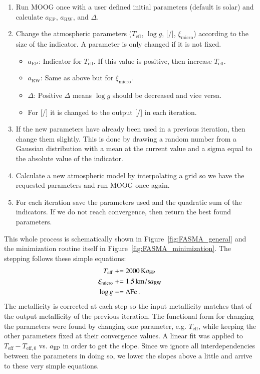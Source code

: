 \documentclass{aa}
\newcommand{\pluseq}{\mathrel{+}=}
\newcommand{\minuseq}{\mathrel{-}=}
\begin{document}
\begin{enumerate}
    \item Run MOOG once with a user defined initial parameters (default is
          solar) and calculate $a_\mathrm{EP}$, $a_\mathrm{RW}$, and
          $\Delta$.
    \item Change the atmospheric parameters ($T_\mathrm{eff}$, $\log g$,
          [/], $\xi_\mathrm{micro}$) according to the size of the
          indicator. A parameter is only changed if it is not fixed.
    \begin{itemize}
        \item $a_\mathrm{EP}$: Indicator for $T_\mathrm{eff}$. If this value
              is positive, then increase $T_\mathrm{eff}$.
        \item $a_\mathrm{RW}$: Same as above but for $\xi_\mathrm{micro}$.
        \item $\Delta$: Positive $\Delta$ means $\log g$
              should be decreased and vice versa.
        \item For [/] it is changed to the output [/]
              in each iteration.
    \end{itemize}
    \item If the new parameters have already been used in a previous iteration,
          then change them slightly. This is done by drawing a random number from
          a Gaussian distribution with a mean at the current value and a sigma
          equal to the absolute value of the indicator.
    \item Calculate a new atmospheric model by interpolating a grid so we have
          the requested parameters and run MOOG once again.
    \item For each iteration save the parameters used and the quadratic sum of
          the indicators. If we do not reach convergence, then return the best
          found parameters.
\end{enumerate}
This whole process is schematically shown in Figure~\ref{fig:FASMA_general} and
the minimization routine itself in Figure~\ref{fig:FASMA_minimization}. The
stepping follows these simple equations:
\begin{align}
    T_\mathrm{eff}     &\pluseq \SI{2000}{K} a_\mathrm{EP}   \\
    \xi_\mathrm{micro} &\pluseq \SI{1.5}{km/s} a_\mathrm{RW} \\
    \log g             &\minuseq \Delta\ion{Fe}.
\end{align}
The metallicity is corrected at each step so the input metallicity matches that
of the output metallicity of the previous iteration. The functional form for
changing the parameters were found by changing one parameter, e.g.
$T_\mathrm{eff}$, while keeping the other parameters fixed at their convergence
values. A linear fit was applied to $T_\mathrm{eff} - T_\mathrm{eff,0}$ vs.
$a_\mathrm{EP}$ in order to get the slope. Since we ignore all interdependencies
between the parameters in doing so, we lower the slopes above a little and
arrive to these very simple equations.
\end{document}
